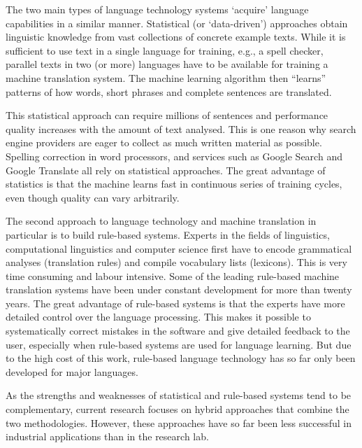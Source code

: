 \begin{multicols}{2}
\begin{itemize}
\begin{multicols}{2}

    The two main types of language technology systems ‘acquire’ language capabilities in a similar manner. Statistical (or ‘data-driven’) approaches obtain linguistic knowledge from vast collections of concrete example texts. While it is sufficient to use text in a single language for training, e.g., a spell checker, parallel texts in two (or more) languages have to be available for training a machine translation system. The machine learning algorithm then “learns” patterns of how words, short phrases and complete sentences are translated. 

    This statistical approach can require millions of sentences and performance quality increases with the amount of text analysed. This is one reason why search engine providers are eager to collect as much written material as possible. Spelling correction in word processors, and services such as Google Search and Google Translate all rely on statistical approaches. The great advantage of statistics is that the machine learns fast in continuous series of training cycles, even though quality can vary arbitrarily.

    The second approach to language technology and machine translation in particular is to build rule-based systems. Experts in the fields of linguistics, computational linguistics and computer science first have to encode grammatical analyses (translation rules) and compile vocabulary lists (lexicons). This is very time consuming and labour intensive. Some of the leading rule-based machine translation systems have been under constant development for more than twenty years. The great advantage of rule-based systems is that the experts have more detailed control over the language processing. This makes it possible to systematically correct mistakes in the software and give detailed feedback to the user, especially when rule-based systems are used for language learning. But due to the high cost of this work, rule-based language technology has so far only been developed for major languages. 
    

    As the strengths and weaknesses of statistical and rule-based systems tend to be complementary, current research focuses on hybrid approaches that combine the two methodologies. However, these approaches have so far been less successful in industrial applications than in the research lab. 


\end{multicols}
\end{itemize}
\end{multicols}
